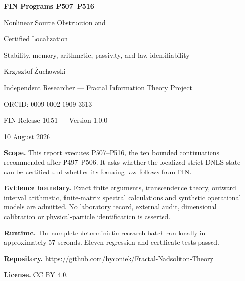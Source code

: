 \documentclass[11pt,a4paper]{article}
\theoremstyle{definition}
\theoremstyle{remark}
\begin{document}
\hypersetup{pageanchor=false}

\begin{titlepage}
\centering
\vspace*{15mm}
{\Huge\bfseries FIN Programs P507--P516\par}
\vspace{5mm}
{\Large Nonlinear Source Obstruction and\par}
{\Large Certified Localization\par}
\vspace{4mm}
{\large Stability, memory, arithmetic, passivity, and law identifiability\par}
\vspace{15mm}
{\Large Krzysztof Żuchowski\par}
\vspace{2mm}
{\normalsize Independent Researcher --- Fractal Information Theory Project\par}
{\normalsize ORCID: 0009-0002-0909-3613\par}
\vspace{10mm}
{\large FIN Release 10.51 --- Version 1.0.0\par}
{\large 10 August 2026\par}
\vfill
\begin{minipage}{0.90\textwidth}
\small
\textbf{Scope.} This report executes P507--P516, the ten bounded continuations recommended after P497--P506. It asks whether the localized strict-DNLS state can be certified and whether its focusing law follows from FIN.

\medskip
\textbf{Evidence boundary.} Exact finite arguments, transcendence theory, outward interval arithmetic, finite-matrix spectral calculations and synthetic operational models are admitted. No laboratory record, external audit, dimensional calibration or physical-particle identification is asserted.

\medskip
\textbf{Runtime.} The complete deterministic research batch ran locally in approximately 57 seconds. Eleven regression and certificate tests passed.

\medskip
\textbf{Repository.} \url{https://github.com/hyconiek/Fractal-Nadsoliton-Theory}

\textbf{License.} CC BY 4.0.
\end{minipage}
\vfill
\end{titlepage}
\hypersetup{pageanchor=true}
\end{document}

